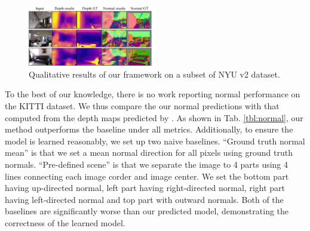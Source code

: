 \begin{figure}[h]
\centering
\includegraphics[width=0.5\textwidth]{figures/indoor_visual_comp.pdf}
\caption{Qualitative results of our framework on a subset of NYU v2 dataset.}
\vspace{-1.\baselineskip}
\label{fig:nyu_visual}
\end{figure}

To the best of our knowledge, there is no work reporting normal performance on the KITTI dataset. We thus compare the our normal predictions with that computed from the depth maps predicted by \cite{zhou2017unsupervised}. As shown in Tab. \ref{tbl:normal}, our method outperforms the baseline under all metrics. Additionally, to ensure the model is learned reasonably, we set up two naive baselines. ``Ground truth normal mean'' is that we set a mean normal direction for all pixels using ground truth normals. ``Pre-defined scene'' is that we separate the image to 4 parts using 4 lines connecting each image corder and image center. We set the bottom part having up-directed normal, left part having right-directed normal, right part having left-directed normal and top part with outward normals. Both of the baselines are significantly worse than our predicted model, demonstrating the correctness of the learned model.



